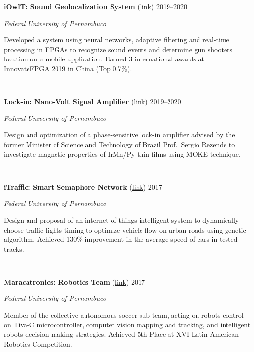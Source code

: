 \documentclass[letterpaper,10pt]{article}
\newcommand{\entry}[4]{

\begin{minipage}[t]{.15\textwidth}
\end{minipage}
\hfill\vline\hfill 
\begin{minipage}[t]{0.95\textwidth}
#2 \hfill \textsc{#1}

\textit{#3}

\footnotesize{#4}
\end{minipage}\\\vspace{.25cm}}
\newcommand{\ufpe}{Federal University of Pernambuco}
\begin{document}
\entry{2019--2020}{\textbf{iOwlT: Sound Geolocalization System} (\href{https://www.matheussfarias.com/iowlt.html}{link})}{\ufpe}{
	Developed a system using neural networks, adaptive filtering and real-time processing in FPGAs to recognize sound events and determine gun shooters location on a mobile application. Earned 3 international awards at InnovateFPGA 2019 in China (Top 0.7\%).
}

\entry{2019--2020}{\textbf{Lock-in: Nano-Volt Signal Amplifier} (\href{https://www.matheussfarias.com/lockin.html}{link})}{\ufpe}{
	Design and optimization of a phase-sensitive lock-in amplifier advised by the former Minister of Science and Technology of Brazil Prof.\ Sergio Rezende to investigate magnetic properties of IrMn/Py thin films using MOKE technique.
}

\entry{2017}{\textbf{iTraffic: Smart Semaphore Network} (\href{https://www.matheussfarias.com/itraffic.html}{link})}{\ufpe}{
	Design and proposal of an internet of things intelligent system to dynamically choose traffic lights timing to optimize vehicle flow on urban roads using genetic algorithm. Achieved 130\% improvement in the average speed of cars in tested tracks.
}

\entry{2017}{\textbf{Maracatronics: Robotics Team} (\href{https://www.matheussfarias.com/maracatronics.html}{link})}{\ufpe}{
	Member of the collective autonomous soccer sub-team, acting on robots control on Tiva-C microcontroller, computer vision mapping and tracking, and intelligent robots decision-making strategies. Achieved 5th Place at XVI Latin American Robotics Competition.
}

\vspace*{-.25cm}
\end{document}
